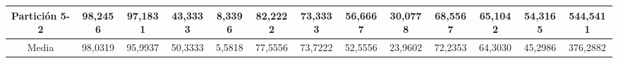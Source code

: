 \documentclass[12pt]{article}
\begin{document}
\begin{table}[H]
{\begin{tabular}{|c|cccc|cccc|cccc|}
Partición 5-2 & \multicolumn{1}{c|}{98,2456}                                                  & \multicolumn{1}{c|}{97,1831}                                                 & \multicolumn{1}{c|}{43,3333} & 8,3396 & \multicolumn{1}{c|}{82,2222}                                                  & \multicolumn{1}{c|}{73,3333}                                                 & \multicolumn{1}{c|}{56,6667} & 30,0778 & \multicolumn{1}{c|}{68,5567}                                                  & \multicolumn{1}{c|}{65,1042}                                                 & \multicolumn{1}{c|}{54,3165} & 544,5411 \\ \hline
Media         & \multicolumn{1}{c|}{98,0319}                                                  & \multicolumn{1}{c|}{95,9937}                                                 & \multicolumn{1}{c|}{50,3333} & 5,5818 & \multicolumn{1}{c|}{77,5556}                                                  & \multicolumn{1}{c|}{73,7222}                                                 & \multicolumn{1}{c|}{52,5556} & 23,9602 & \multicolumn{1}{c|}{72,2353}                                                  & \multicolumn{1}{c|}{64,3030}                                                 & \multicolumn{1}{c|}{45,2986} & 376,2882 \\ \hline
\end{tabular}}
\end{table}
\end{document}
